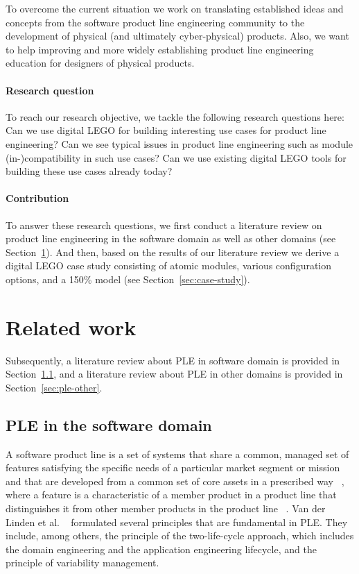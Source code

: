 \documentclass[sigconf,review]{acmart}
\begin{document}
To overcome the current situation we work on translating established ideas and concepts from the software product line engineering community to the development of physical (and ultimately cyber-physical) products.
Also, we want to help improving and more widely establishing product line engineering education for designers of physical products.

\paragraph{Research question}

To reach our research objective, we tackle the following research questions here:
Can we use digital LEGO for building interesting use cases for product line engineering?
Can we see typical issues in product line engineering such as module (in-)compatibility in such use cases?
Can we use existing digital LEGO tools for building these use cases already today?

\paragraph{Contribution}

To answer these research questions, we first conduct a literature review on product line engineering in the software domain as well as other domains (see Section~\ref{sec:related-work}).
And then, based on the results of our literature review we derive a digital LEGO case study consisting of atomic modules, various configuration options, and a 150\% model (see Section~\ref{sec:case-study}).

\section{Related work}
\label{sec:related-work}

Subsequently, a literature review about PLE in software domain is provided in Section~\ref{sec:ple-software},
and a literature review about PLE in other domains is provided in Section~\ref{sec:ple-other}.

\subsection{PLE in the software domain}
\label{sec:ple-software}

A software product line is a set of systems that share a common, managed set of features satisfying the specific needs of a particular market segment or mission and that are developed from a common set of core assets in a prescribed way ~\cite{Clements_2002}, where
a feature is a characteristic of a member product in a product line that distinguishes it from other member products in the product line ~\cite{ISO/IEC_26550}.
Van der Linden et al. ~\cite{Linden_2007} formulated several principles that are fundamental in PLE. They include, among others, the principle of the two-life-cycle approach, which includes the domain engineering and the application engineering lifecycle, and the principle of variability management.
\end{document}
